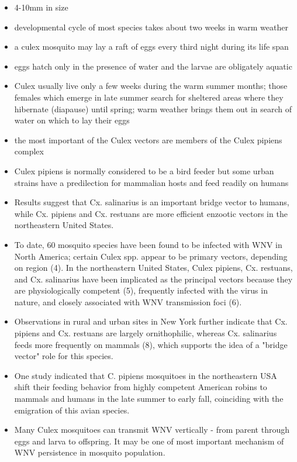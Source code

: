 \documentclass[a4, 12pt]{article}
\begin{document}
\begin{itemize}
\item 4-10mm in size
\item developmental cycle of most species takes about two weeks in warm weather
\item a culex mosquito may lay a raft of eggs every third night during its life span
\item eggs hatch only in the presence of water and the larvae are obligately aquatic
\item Culex usually live only a few weeks during the warm summer months; those females which emerge in late summer search for sheltered areas where they hibernate (diapause) until spring; warm weather brings them out in search of water on which to lay their eggs
\item the most important of the Culex vectors are members of the Culex pipiens complex
\item Culex pipiens is normally considered to be a bird feeder but some urban strains have a predilection for mammalian hosts and feed readily on humans
\item Results suggest that Cx. salinarius is an important bridge vector to humans, while Cx. pipiens and Cx. restuans are more efficient enzootic vectors in the northeastern United States. \citep{molaei2006host}
\item To date, 60 mosquito species have been found to be infected with WNV in North America; certain Culex spp. appear to be primary vectors, depending on region (4). In the northeastern United States, Culex pipiens, Cx. restuans, and Cx. salinarius have been implicated as the principal vectors because they are physiologically competent (5), frequently infected with the virus in nature, and closely associated with WNV transmission foci (6). \citep{molaei2006host}
\item Observations in rural and urban sites in New York further indicate that Cx. pipiens and Cx. restuans are largely ornithophilic, whereas Cx. salinarius feeds more frequently on mammals (8), which supports the idea of a "bridge vector" role for this species. \citep{molaei2006host}
\item One study indicated that C. pipiens mosquitoes in the northeastern USA shift their feeding behavior from highly competent American robins to mammals and humans in the late summer to early fall, coinciding with the emigration of this avian species.
\item Many Culex mosquitoes can transmit WNV vertically - from parent through eggs and larva to offspring. It may be one of most important mechanism of WNV persistence in mosquito population.
\end{itemize}
\end{document}
